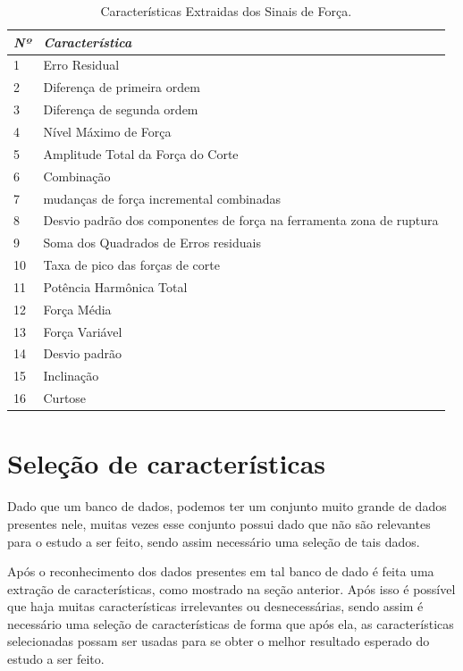 \begin{table}[ht]
    \caption{Características Extraidas dos Sinais de Força.}
    {\centering
    \begin{tabular}{ll} \toprule
    \emph{Nº} & \emph{Característica}\\ \midrule
   1 & Erro Residual \\
2 & Diferença de primeira ordem \\
3 & Diferença de segunda ordem \\
4 & Nível Máximo de Força \\
5 & Amplitude Total da Força do Corte \\
6 & Combinação  \\
7 & mudanças de força incremental combinadas \\
8 & Desvio padrão dos componentes de força na ferramenta zona de ruptura \\
9 & Soma dos Quadrados de Erros residuais \\
10 & Taxa de pico das forças de corte \\
11 & Potência Harmônica Total \\
12 & Força Média \\
13 & Força Variável \\
14 & Desvio padrão \\
15 & Inclinação \\
16 & Curtose \\
 \bottomrule
    \end{tabular}\par
    }
\end{table}

\newpage
\section{Seleção de características}
Dado que um banco de dados, podemos ter um conjunto muito grande de dados presentes nele, muitas vezes esse conjunto possui dado que não são relevantes para o estudo a ser feito, sendo assim necessário uma seleção de tais dados. 

Após o reconhecimento dos dados presentes em tal banco de dado é feita uma extração de características, como mostrado na seção anterior. Após isso é possível que haja muitas características irrelevantes ou desnecessárias, sendo assim é necessário uma seleção de características de forma que após ela, as características selecionadas possam ser usadas para se obter o melhor resultado esperado do estudo a ser feito.

